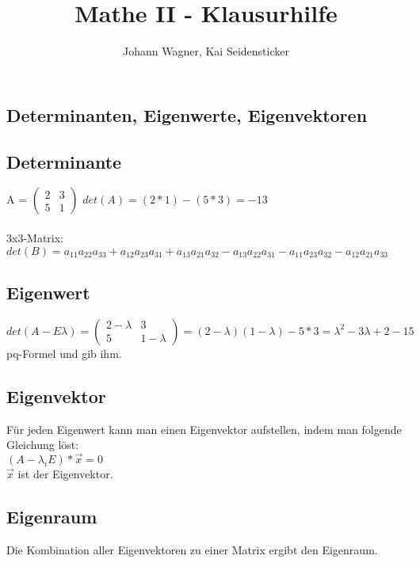 \documentclass[a4paper,landscape, 11pt]{article}
\author{Johann Wagner, Kai Seidensticker}
\title{Mathe II - Klausurhilfe}
\begin{document}
    \begin{multicols}{4}
        
    
    \begin{small}
    \section{Determinanten, Eigenwerte, Eigenvektoren}
        \subsection{Determinante}
        A = $\left(
        \begin{matrix}
            2 & 3 \\
            5 & 1
        \end{matrix}
        \right)$ \hspace{2pt} 
        $det(A) = (2*1) - (5*3) = -13$ \\ \\
        3x3-Matrix:\\
        $det(B) = a_{11} a_{22} a_{33} + a_{12} a_{23} a_{31} + a_{13} a_{21} a_{32} - a_{13} a_{22} a_{31} - a_{11} a_{23} a_{32} - a_{12} a_{21} a_{33}$  
        
        \subsection{Eigenwert}
        $det(A - E\lambda) = 
        \left(
        \begin{matrix}
            2-\lambda & 3 \\
            5 & 1-\lambda
        \end{matrix}
        \right) = (2-\lambda)(1-\lambda) - 5*3 = \lambda^2 - 3\lambda  + 2 - 15$\\
        pq-Formel und gib ihm. 
        
        \subsection{Eigenvektor}
        Für jeden Eigenwert kann man einen Eigenvektor aufstellen, indem man folgende Gleichung löst: \\
        $ (A - \lambda_iE)*\vec{x} = 0$\\
        $\vec{x}$ ist der Eigenvektor.
        
        \subsection{Eigenraum}
        Die Kombination aller Eigenvektoren zu einer Matrix ergibt den Eigenraum.

\end{small}
\end{multicols}
\end{document}
